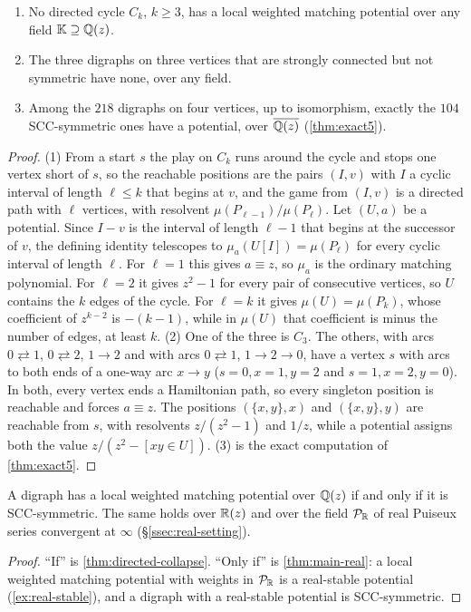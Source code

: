 \begin{proposition}\label{prop:fails}
\begin{enumerate}[label=\textup{(\arabic*)}]
\item No directed cycle $C_k$, $k\ge3$, has a local weighted matching potential over any field $\mathbb K\supseteq\mathbb{Q}(z)$.
\item The three digraphs on three vertices that are strongly connected but not symmetric have none, over any field.
\item Among the $218$ digraphs on four vertices, up to isomorphism, exactly the $104$ SCC-symmetric ones have a potential, over $\overline{\mathbb{Q}(z)}$ \textup{(}\cref{thm:exact5}\textup{)}.
\end{enumerate}
\end{proposition}
\begin{proof}
(1) From a start $s$ the play on $C_k$ runs around the cycle and stops one vertex short of $s$, so the reachable positions are the pairs $(I,v)$ with $I$ a cyclic interval of length $\ell\le k$ that begins at $v$, and the game from $(I,v)$ is a directed path with $\ell$ vertices, with resolvent $\mu(P_{\ell-1})/\mu(P_\ell)$. Let $(U,a)$ be a potential. Since $I-v$ is the interval of length $\ell-1$ that begins at the successor of $v$, the defining identity telescopes to $\mu_a(U[I])=\mu(P_\ell)$ for every cyclic interval of length $\ell$. For $\ell=1$ this gives $a\equiv z$, so $\mu_a$ is the ordinary matching polynomial. For $\ell=2$ it gives $z^2-1$ for every pair of consecutive vertices, so $U$ contains the $k$ edges of the cycle. For $\ell=k$ it gives $\mu(U)=\mu(P_k)$, whose coefficient of $z^{k-2}$ is $-(k-1)$, while in $\mu(U)$ that coefficient is minus the number of edges, at least $k$.
(2) One of the three is $C_3$. The others, with arcs $0\rightleftarrows1$, $0\rightleftarrows2$, $1\to2$ and with arcs $0\rightleftarrows1$, $1\to2\to0$, have a vertex $s$ with arcs to both ends of a one-way arc $x\to y$ ($s=0,x=1,y=2$ and $s=1,x=2,y=0$). In both, every vertex ends a Hamiltonian path, so every singleton position is reachable and forces $a\equiv z$. The positions $(\{x,y\},x)$ and $(\{x,y\},y)$ are reachable from $s$, with resolvents $z/(z^2-1)$ and $1/z$, while a potential assigns both the value $z/(z^2-[xy\in U])$.
(3) is the exact computation of \cref{thm:exact5}.
\end{proof}

\begin{theorem}\label{thm:conj610}
A digraph has a local weighted matching potential over $\mathbb{Q}(z)$ if and only if it is SCC-symmetric. The same holds over $\mathbb{R}(z)$ and over the field $\mathcal{P}_{\mathbb{R}}$ of real Puiseux series convergent at $\infty$ \textup{(}\S\ref{ssec:real-setting}\textup{)}.
\end{theorem}
\begin{proof}
``If'' is \cref{thm:directed-collapse}. ``Only if'' is \cref{thm:main-real}: a local weighted matching potential with weights in $\mathcal{P}_{\mathbb{R}}$ is a real-stable potential (\cref{ex:real-stable}), and a digraph with a real-stable potential is SCC-symmetric.
\end{proof}

